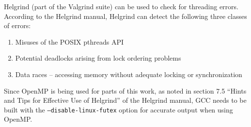 Helgrind (part of the Valgrind suite\cite{valgrind}) can be used to check for threading errors.
According to the Helgrind manual\cite{hgmanual}, Helgrind can detect the following three classes of errors:
\begin{enumerate}
 \item Misuses of the POSIX pthreads API
 \item Potential deadlocks arising from lock ordering problems
 \item Data races -- accessing memory without adequate locking or synchronization
\end{enumerate}

Since OpenMP is being used for parts of this work, as noted in section 7.5 ``Hints and Tips for Effective Use of Helgrind'' of the Helgrind manual\cite{hgmanual}, GCC needs to be built with the \texttt{--disable-linux-futex} option for accurate output when using OpenMP.

